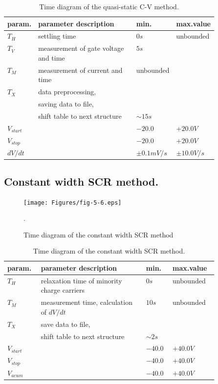 \begin{table}[h!]\centering
  \begin{tabular}{ l p{0.5\linewidth} l l }
    param.      & parameter description & min. & max.value\\
    \hline
    $T_H$       & settling time \dotfill & $0 s$ & unbounded\\
    $T_V$       & measurement of gate voltage and time \dotfill & $5s$\\
    $T_M$       & measurement of current and time \dotfill & unbounded\\
    $T_X$       & data preprocessing,\\
                & saving data to file,\\
                & shift table to next structure \dotfill & $\sim 15s$\\
    $V_{start}$ & \dotfill & $-20.0$ & $+20.0 V$\\
    $V_{stop}$  & \dotfill & $-20.0$ & $+20.0 V$\\
    $dV/dt$     & \dotfill & $\pm 0.1mV/s$ & $\pm 10.0V/s$\\
    \hline
  \end{tabular}
  \caption[Time diagram of the quasi-static C-V method]{Time diagram
    of the quasi-static C-V method.}\label{tab:5.3}
\end{table}

\newpage
\subsection{Constant width SCR method.}\label{sec:5.4.4}

\begin{figure}[h!]\centering
  \texttt{[image: Figures/fig-5-6.eps]}
  \caption[Time diagram of constant width SCR method]{Time diagram of
    the constant width SCR method}.\label{fig:5.6}
\end{figure}

\begin{table}[h!]\centering
  \begin{tabular}{ l p{0.5\linewidth} l l }
    param.      & parameter description & min. & max.value\\
    \hline
    $T_H$       & relaxation time of minority charge carriers \dotfill & $0 s$ & unbounded\\
    $T_M$       & measurement time, calculation of $dV/dt$ \dotfill & $10 s$ & unbounded\\
    $T_X$       & save data to file,\\
                & shift table to next structure \dotfill & $\sim 2s$\\
    $V_{start}$ & \dotfill & $-40.0$ & $+40.0 V$\\
    $V_{stop}$  & \dotfill & $-40.0$ & $+40.0 V$\\
    $V_{acum}$  & \dotfill & $-40.0$ & $+40.0 V$\\
    \hline
  \end{tabular}
  \caption[Time diagram of constant width SCR method]{Time diagram of
    the constant width SCR method.}\label{tab:5.4}
\end{table}


